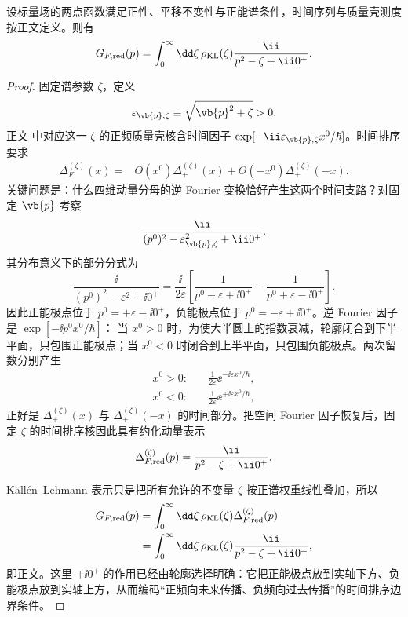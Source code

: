 \begin{proposition}[二点函数的正谱表示]
设标量场的两点函数满足正性、平移不变性与正能谱条件，时间序列与质量壳测度按正文定义。则有
\begin{equation}
 {
 G_{F,\rm red}(p)
 =\int_0^\infty\dd\zeta\,
 \rho_{\rm KL}(\zeta)
 \frac{\ii}{p^2-\zeta+\ii0^+}.}
\label{eq:KL-SI-r12}
\end{equation}
\end{proposition}
\begin{proof}
固定谱参数 $\zeta$，定义
\[
 \varepsilon_{\vb{p},\zeta}
 \equiv\sqrt{\vb{p}^2+\zeta}>0.
\]
正文 中对应这一 $\zeta$ 的正频质量壳核含时间因子
$\exp[-\ii\varepsilon_{\vb{p},\zeta}x^0/\hbar]$。时间排序要求
\begin{align*}
 \Delta_F^{(\zeta)}(x)
 ={}&\Theta(x^0)\Delta_+^{(\zeta)}(x)
 +\Theta(-x^0)\Delta_+^{(\zeta)}(-x).
\end{align*}
关键问题是：什么四维动量分母的逆 Fourier 变换恰好产生这两个时间支路？对固定 $\vb{p}$ 考察
\begin{equation*}
 \frac{\ii}{(p^0)^2-\varepsilon_{\vb{p},\zeta}^2+\ii0^+}.
\end{equation*}
其分布意义下的部分分式为
\begin{equation*}
 \frac{\ii}{(p^0)^2-\varepsilon^2+\ii0^+}
 =\frac{\ii}{2\varepsilon}
 \left[
 \frac1{p^0-\varepsilon+\ii0^+}
 -\frac1{p^0+\varepsilon-\ii0^+}
 \right].
\end{equation*}
因此正能极点位于 $p^0=+\varepsilon-\ii0^+$，负能极点位于
$p^0=-\varepsilon+\ii0^+$。逆 Fourier 因子是
$\exp[-\ii p^0x^0/\hbar]$：
当 $x^0>0$ 时，为使大半圆上的指数衰减，轮廓闭合到下半平面，只包围正能极点；当 $x^0<0$ 时闭合到上半平面，只包围负能极点。两次留数分别产生
\begin{align*}
 x^0>0:&\quad
 \frac{1}{2\varepsilon}
 \ee^{-\ii\varepsilon x^0/\hbar},\\
 x^0<0:&\quad
 \frac{1}{2\varepsilon}
 \ee^{+\ii\varepsilon x^0/\hbar},
\end{align*}
正好是 $\Delta_+^{(\zeta)}(x)$ 与
$\Delta_+^{(\zeta)}(-x)$ 的时间部分。把空间 Fourier 因子恢复后，固定 $\zeta$ 的时间排序核因此具有约化动量表示
\[
 \Delta_{F,\rm red}^{(\zeta)}(p)
 =\frac{\ii}{p^2-\zeta+\ii0^+}.
\]

K\"all\'en--Lehmann 表示只是把所有允许的不变量 $\zeta$ 按正谱权重线性叠加，所以
\begin{align*}
 G_{F,\rm red}(p)
 &=\int_0^\infty\dd\zeta\,
 \rho_{\rm KL}(\zeta)\Delta_{F,\rm red}^{(\zeta)}(p)\\
 &=\int_0^\infty\dd\zeta\,
 \rho_{\rm KL}(\zeta)
 \frac{\ii}{p^2-\zeta+\ii0^+},
\end{align*}
即正文。这里 $+\ii0^+$ 的作用已经由轮廓选择明确：它把正能极点放到实轴下方、负能极点放到实轴上方，从而编码“正频向未来传播、负频向过去传播”的时间排序边界条件。
\end{proof}

